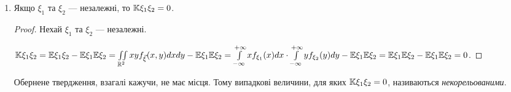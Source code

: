 \begin{enumerate}
\begin{proof}
\begin{enumerate}[label=\Roman*.]
            $\left|\K\xi_1\xi_2\right| \leq \sigma_{\xi_1} \sigma_{\xi_2}$.

            \item Введемо нормовані центровані випадкові величини $\xi_H = \frac{\xi - \E\xi}
            {\sigma_\xi}$, $\E\xi_H =0$, $\D\xi_H = 1$.

            $\E(\xi_{1H} \pm \xi_{2H})^2 \geq 0 \Leftrightarrow 
            \E(\xi^2_{1H}\pm2\xi_{1H}\xi_{2H}+\xi^2_{2H}) \geq 0 
            \Leftrightarrow 2 \pm 
            2\frac{\K\xi_1\xi_2}{\sigma_{\xi_1}\sigma_{\xi_2}} \geq 0 
            \Leftrightarrow $

            $\left|\K\xi_1\xi_2\right| \leq \sigma_{\xi_1} \sigma_{\xi_2}$.
        \end{enumerate}
    \end{proof}
    \item Якщо $\xi_1$ та $\xi_2$ --- незалежні, то $\mathbb{K}\xi_1\xi_2 = 0$.
    \begin{proof}
        Нехай $\xi_1$ та $\xi_2$ --- незалежні.

        $\mathbb{K}\xi_1\xi_2 = \mathbb{E}\xi_1\xi_2 - \mathbb{E}\xi_1\mathbb{E}\xi_2 = 
        \iint\limits_{\mathbb{R}^2} xy f_{\vec{\xi}}(x,y)dx dy 
        - \mathbb{E}\xi_1\mathbb{E}\xi_2
        = \int\limits_{-\infty}^{+\infty}xf_{\xi_1}(x)dx \cdot
        \int\limits_{-\infty}^{+\infty}yf_{\xi_2}(y)dy
        - \mathbb{E}\xi_1\mathbb{E}\xi_2 = 
        \mathbb{E}\xi_1\mathbb{E}\xi_2 - \mathbb{E}\xi_1\mathbb{E}\xi_2 = 0$.
    \end{proof}

    Обернене твердження, взагалі кажучи, не має місця. Тому випадкові 
    величини, для яких $\mathbb{K}\xi_1\xi_2 = 0$, називаються 
    \emph{некорельованими}. 
\end{enumerate}

